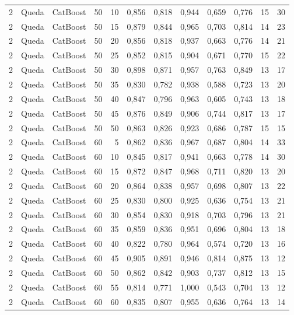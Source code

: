 \begin{longtable}{ccclrrrrrrrr}
2 & Queda & CatBoost & 50 & 10 & 0,856 & 0,818 & 0,944 & 0,659 & 0,776 & 15 & 30 \\
2 & Queda & CatBoost & 50 & 15 & 0,879 & 0,844 & 0,965 & 0,703 & 0,814 & 14 & 23 \\
2 & Queda & CatBoost & 50 & 20 & 0,856 & 0,818 & 0,937 & 0,663 & 0,776 & 14 & 21 \\
2 & Queda & CatBoost & 50 & 25 & 0,852 & 0,815 & 0,904 & 0,671 & 0,770 & 15 & 22 \\
2 & Queda & CatBoost & 50 & 30 & 0,898 & 0,871 & 0,957 & 0,763 & 0,849 & 13 & 17 \\
2 & Queda & CatBoost & 50 & 35 & 0,830 & 0,782 & 0,938 & 0,588 & 0,723 & 13 & 20 \\
2 & Queda & CatBoost & 50 & 40 & 0,847 & 0,796 & 0,963 & 0,605 & 0,743 & 13 & 18 \\
2 & Queda & CatBoost & 50 & 45 & 0,876 & 0,849 & 0,906 & 0,744 & 0,817 & 13 & 17 \\
2 & Queda & CatBoost & 50 & 50 & 0,863 & 0,826 & 0,923 & 0,686 & 0,787 & 15 & 15 \\
2 & Queda & CatBoost & 60 & 5 & 0,862 & 0,836 & 0,967 & 0,687 & 0,804 & 14 & 33 \\
2 & Queda & CatBoost & 60 & 10 & 0,845 & 0,817 & 0,941 & 0,663 & 0,778 & 14 & 30 \\
2 & Queda & CatBoost & 60 & 15 & 0,872 & 0,847 & 0,968 & 0,711 & 0,820 & 13 & 20 \\
2 & Queda & CatBoost & 60 & 20 & 0,864 & 0,838 & 0,957 & 0,698 & 0,807 & 13 & 22 \\
2 & Queda & CatBoost & 60 & 25 & 0,830 & 0,800 & 0,925 & 0,636 & 0,754 & 13 & 21 \\
2 & Queda & CatBoost & 60 & 30 & 0,854 & 0,830 & 0,918 & 0,703 & 0,796 & 13 & 21 \\
2 & Queda & CatBoost & 60 & 35 & 0,859 & 0,836 & 0,951 & 0,696 & 0,804 & 13 & 18 \\
2 & Queda & CatBoost & 60 & 40 & 0,822 & 0,780 & 0,964 & 0,574 & 0,720 & 13 & 16 \\
2 & Queda & CatBoost & 60 & 45 & 0,905 & 0,891 & 0,946 & 0,814 & 0,875 & 13 & 12 \\
2 & Queda & CatBoost & 60 & 50 & 0,862 & 0,842 & 0,903 & 0,737 & 0,812 & 13 & 15 \\
2 & Queda & CatBoost & 60 & 55 & 0,814 & 0,771 & 1,000 & 0,543 & 0,704 & 13 & 12 \\
2 & Queda & CatBoost & 60 & 60 & 0,835 & 0,807 & 0,955 & 0,636 & 0,764 & 13 & 14 \\

\end{longtable}
